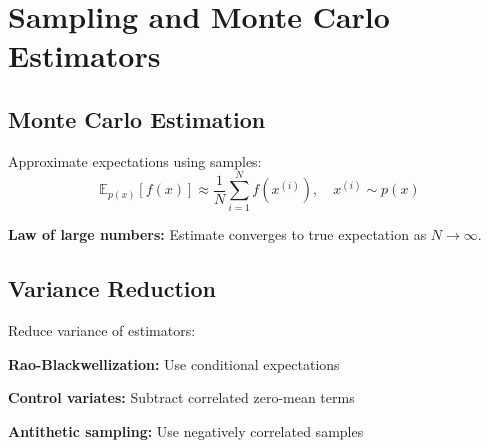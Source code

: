 
\section{Sampling and Monte Carlo Estimators}
\label{sec:mc-estimators}

\subsection{Monte Carlo Estimation}

Approximate expectations using samples:
\begin{equation}
\mathbb{E}_{p(x)}[f(x)] \approx \frac{1}{N} \sum_{i=1}^{N} f(x^{(i)}), \quad x^{(i)} \sim p(x)
\end{equation}

\textbf{Law of large numbers:} Estimate converges to true expectation as $N \to \infty$.

\subsection{Variance Reduction}

Reduce variance of estimators:

\textbf{Rao-Blackwellization:} Use conditional expectations

\textbf{Control variates:} Subtract correlated zero-mean terms

\textbf{Antithetic sampling:} Use negatively correlated samples

